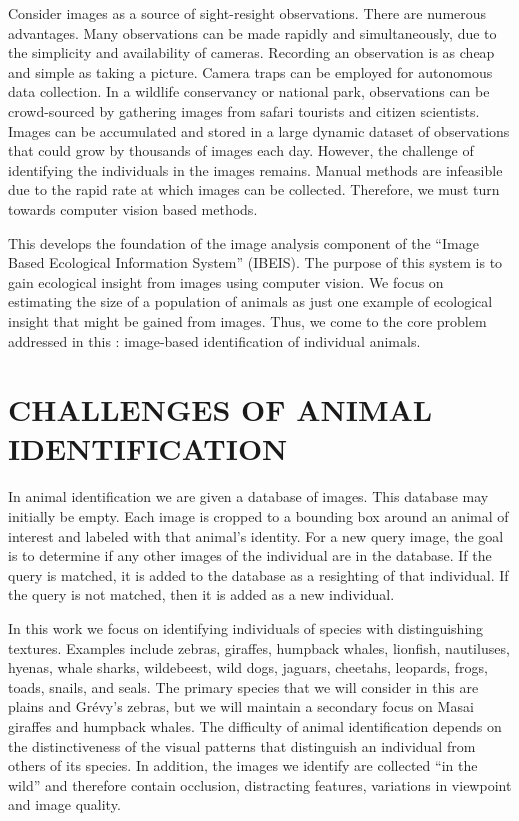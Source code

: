     Consider images as a source of sight-resight observations. There are numerous advantages. Many observations can
    be made rapidly and simultaneously, due to the simplicity and availability of cameras. Recording an observation
    is as cheap and simple as taking a picture. Camera traps can be employed for autonomous data collection. In a
    wildlife conservancy or national park, observations can be crowd-sourced by gathering images from safari
    tourists and citizen scientists. Images can be accumulated and stored in a large dynamic dataset of
    observations that could grow by thousands of images each day. However, the challenge of identifying the
    individuals in the images remains. Manual methods are infeasible due to the rapid rate at which images can be
    collected. Therefore, we must turn towards computer vision based methods.

    This \thesis{} develops the foundation of the image analysis component of the ``Image Based Ecological
      Information System'' (IBEIS).
    The purpose of this system is to gain ecological insight from images using computer vision.
    We focus on estimating the size of a population of animals as just one example of ecological insight that
      might be gained from images.
    Thus, we come to the core problem addressed in this \thesis{}:
    image-based identification of individual animals.

\section{CHALLENGES OF ANIMAL IDENTIFICATION}\label{sec:challenges}

    In animal identification we are given a database of images.
    This database may initially be empty.
    Each image is cropped to a bounding box around an animal of interest and labeled with that animal's identity.
    For a new query image, the goal is to determine if any other images of the individual are in the database.
    If the query is matched, it is added to the database as a resighting of that individual.
    If the query is not matched, then it is added as a new individual.

    In this work we focus on identifying individuals of species with distinguishing textures. Examples include
    zebras, giraffes, humpback whales, lionfish, nautiluses, hyenas, whale sharks, wildebeest, wild dogs, jaguars,
    cheetahs, leopards, frogs, toads, snails, and seals. The primary species that we will consider in this
    \thesis{} are plains and Grévy's zebras, but we will maintain a secondary focus on Masai giraffes and humpback
    whales. The difficulty of animal identification depends on the distinctiveness of the visual patterns that
    distinguish an individual from others of its species. In addition, the images we identify are collected ``in
    the wild'' and therefore contain occlusion, distracting features, variations in viewpoint and image quality.

